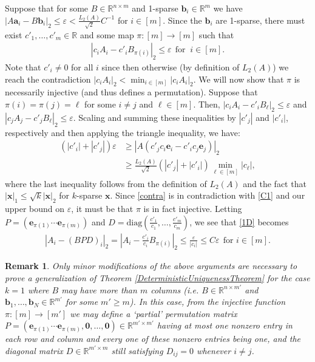 \documentclass[journal, twocolumn]{IEEEtran}
\newtheorem{remark}{Remark}
\begin{document}
Suppose that for some $B \in \mathbb{R}^{n \times m}$ and 1-sparse $\mathbf{b}_i \in \mathbb{R}^m$ we have  $|A\mathbf{a}_i - B\mathbf{b}_i|_2 \leq \varepsilon < \frac{L_2(A)}{\sqrt{2}}C^{-1}$ for $i \in [m]$. Since the $\mathbf{b}_i$ are 1-sparse, there must exist $c'_1, \ldots, c'_m \in \mathbb{R}$ and some map $\pi: [m] \to [m]$ such that 
\begin{align}\label{1D}
|c_iA_i - c'_iB_{\pi(i)}|_2 \leq \varepsilon \ \ \text{for } \  i \in [m].
\end{align} 
Note that $c'_i \neq 0$ for all $i$ since then otherwise (by definition of $L_2(A)$) we reach the contradiction $|c_iA_i|_2 < \min_{i \in [m]}|c_iA_i|_2$. We will now show that $\pi$ is necessarily injective (and thus defines a permutation). Suppose that $\pi(i) = \pi(j) = \ell$ for some $i \neq j$ and $\ell \in [m]$. Then, $|c_iA_i - c'_iB_{\ell}|_2  \leq \varepsilon$ and $|c_jA_j - c'_jB_{\ell}|_2 \leq \varepsilon$. Scaling and summing these inequalities by $|c'_j|$ and $|c'_i|$, respectively and then applying the triangle inequality, we have:
\begin{align}\label{contra}
(|c'_i| + |c'_j|) \varepsilon
&\geq |A(c'_jc_i\mathbf{e}_i - c'_ic_j\mathbf{e}_j)|_2 \\
&\geq \frac{L_2(A)}{\sqrt{2}} \left( |c'_j| + |c'_i| \right) \min_{\ell \in [m]} |c_\ell |,
\end{align}
%
where the last inequality follows from the definition of $L_2(A)$ and the fact that $|\mathbf{x}|_1 \leq \sqrt{k}|\mathbf{x}|_2$ for $k$-sparse $\mathbf{x}$. Since \eqref{contra} is in contradiction with \eqref{C1} and our upper bound on $\varepsilon$, it must be that $\pi$ is in fact injective. Letting $P = \left( \mathbf{e}_{\pi(1)} \cdots \mathbf{e}_{\pi(m)}\right)$ and $D = \text{diag}(\frac{c'_1}{c_1},\ldots,\frac{c'_m}{c_m})$, we see that \eqref{1D} becomes 
\begin{align}\label{k=1result}
|A_i - (BPD)_i|_2 = |A_i - \frac{c'_i}{c_i}B_{\pi(i)}|_2 \leq \frac{\varepsilon}{|c_i|} \leq C\varepsilon \ \ \text{for } i \in [m].
\end{align}

\begin{remark}\label{m'geqmk=1}
Only minor modifications of the above arguments are necessary to prove a generalization of Theorem \ref{DeterministicUniquenessTheorem} for the case $k=1$ where $B$ may have more than $m$ columns (i.e. $B \in \mathbb{R}^{n \times m'}$ and $\mathbf{b}_1, \ldots, \mathbf{b}_N \in \mathbb{R}^{m'}$ for some $m' \geq m$). In this case, from the injective function $\pi: [m] \rightarrow [m']$ we may define a `partial' permutation matrix $P = \left( \mathbf{e}_{\pi(1)} \cdots \mathbf{e}_{\pi(m)}, \mathbf{0}, \ldots, \mathbf{0} \right) \in \mathbb{R}^{m' \times m'}$ having at most one nonzero entry in each row and column and every one of these nonzero entries being one, and the diagonal matrix $D \in \mathbb{R}^{m' \times m}$ still satisfying $D_{ij} = 0$ whenever $i \neq j$.
\end{remark}
\end{document}
